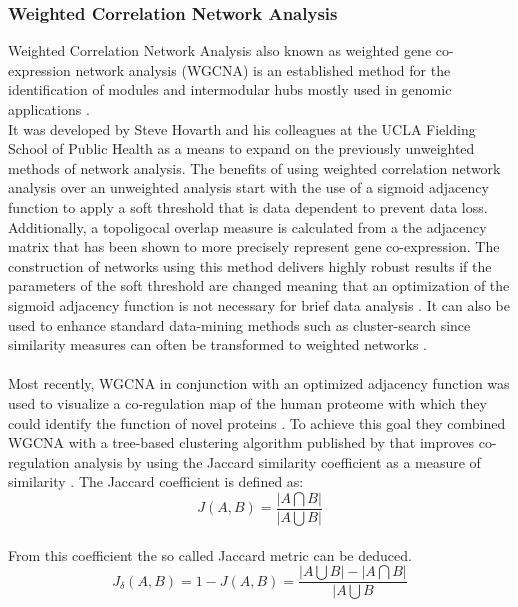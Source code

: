 \subsubsection{Weighted Correlation Network Analysis}
Weighted Correlation Network Analysis also known as weighted gene co-expression network analysis (WGCNA) is an established method for the identification of modules and intermodular hubs mostly used in genomic applications \citep{Horvath.2011}.\\
It was developed by Steve Hovarth and his colleagues at the UCLA Fielding School of Public Health as a means to expand on the previously unweighted methods of network analysis. The benefits of using weighted correlation network analysis over an unweighted analysis start with the use of a sigmoid adjacency function to apply a soft threshold that is data dependent to prevent data loss. Additionally, a topoligocal overlap measure is calculated from a the adjacency matrix that has been shown to more precisely represent gene co-expression. The construction of networks using this method delivers highly robust results if the parameters of the soft threshold are changed meaning that an optimization of the sigmoid adjacency function is not necessary for brief data analysis \citep{Zhang.2005}. It can also be used to enhance standard data-mining methods such as cluster-search since similarity measures can often be transformed to weighted networks \citep{Oldham.2012}.\\\\
Most recently, WGCNA in conjunction with an optimized adjacency function was used to visualize a co-regulation map of the human proteome with which they could identify the function of novel proteins \citep{Kustatscher.2019}. To achieve this goal they combined WGCNA with a tree-based clustering algorithm published by \cite{Buttrey.2015} that improves co-regulation analysis by using the Jaccard similarity coefficient as a measure of similarity \citep{Gupta.2018}. The Jaccard coefficient is defined as:\\
\begin{equation}
    J(A,B) = \frac{|A \bigcap B|}{|A \bigcup B|}
\end{equation}\\
From this coefficient the so called Jaccard metric can be deduced.\\
\begin{equation}
    J_\delta(A,B) = 1 - J(A,B) = \frac{|A \bigcup B|-|A \bigcap B|}{|A \bigcup B}
\end{equation}\\
